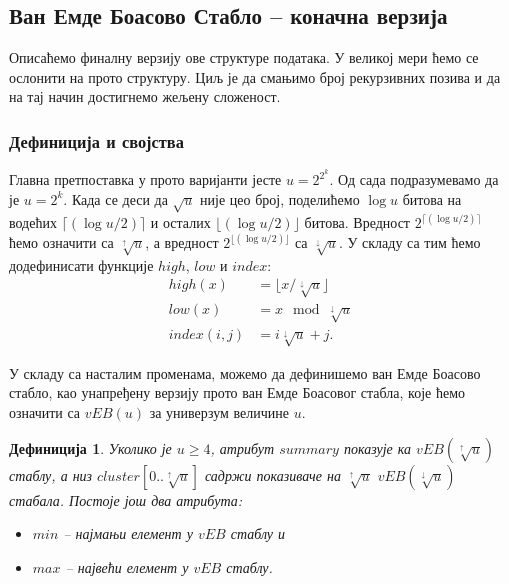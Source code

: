 \documentclass[11pt, a4paper]{article}
\newtheorem{definicija}{\selectlanguage{russian} Дефиниција} [subsection]
\theoremstyle{remark}
\numberwithin{equation}{section}
\begin{document}
	\subsection{Ван Емде Боасово Стабло -- коначна верзија}
	
	Описаћемо финалну верзију ове структуре података. У великој мери ћемо се ослонити на прото структуру. Циљ је да смањимо број рекурзивних позива и да на тај начин достигнемо жељену сложеност.
	
	\subsubsection{Дефиниција и својства}
	Главна претпоставка у прото варијанти јесте $u=2^{2^k}$. Од сада подразумевамо да је $u=2^k$. Када се деси да $\sqrt u$ није цео број, поделићемо $\log u$ битова на водећих $\lceil (\log u /2) \rceil$ и осталих $\lfloor (\log u/2) \rfloor$ битова. Вредност $2^{\lceil (\log u /2) \rceil}$ ћемо означити са $\sqrt[\uparrow]{u}$, а вредност $2^{\lfloor (\log u/2) \rfloor}$ са $\sqrt[\downarrow]{u}$. У складу са тим ћемо додефинисати функције $high$, $low$ и $index$:
	\begin{equation}
		\begin{split}
		high(x) &= \lfloor x/\sqrt[\downarrow]{u} \rfloor \\
		low(x) &= x \mod \sqrt[\downarrow]{u} \\
		index(i, j) &= i\sqrt[\downarrow]{u}+j.
		\end{split}
	\end{equation}
	
	\noindent У складу са насталим променама, можемо да дефинишемо ван Емде Боасово стабло, као унапређену верзију прото ван Емде Боасовог стабла, које ћемо означити са $vEB(u)$ за универзум величине $u$.
	\begin{definicija}
		\normalfont
		Уколико је $u\geq4$, атрибут $summary$ показује ка $vEB(\sqrt[\uparrow]{u})$ стаблу, а низ $cluster[0..\sqrt[\uparrow]{u}]$ садржи показиваче на $\sqrt[\uparrow]{u}$ $vEB(\sqrt[\downarrow]{u})$ стабала. Постоје још два атрибута:
		\begin{itemize}
			\item $min$ -- најмањи елемент у $vEB$ стаблу и
			\item $max$ -- највећи елемент у $vEB$ стаблу.
		\end{itemize}
	\end{definicija}
\end{document}

